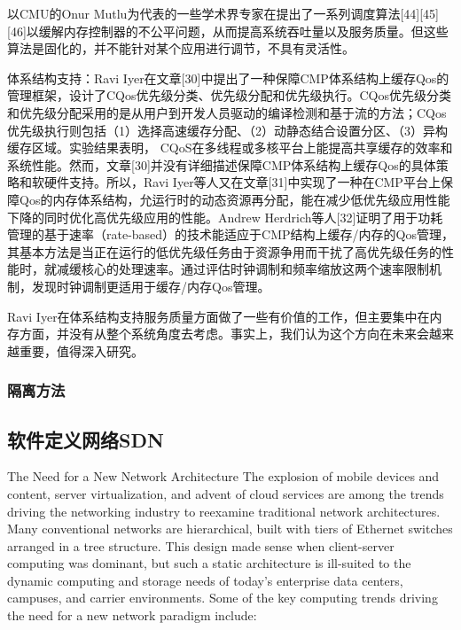 以CMU的Onur Mutlu为代表的一些学术界专家在提出了一系列调度算法[44][45][46]以缓解内存控制器的不公平问题，从而提高系统吞吐量以及服务质量。但这些算法是固化的，并不能针对某个应用进行调节，不具有灵活性。

体系结构支持：Ravi Iyer在文章[30]中提出了一种保障CMP体系结构上缓存Qos的管理框架，设计了CQos优先级分类、优先级分配和优先级执行。CQos优先级分类和优先级分配采用的是从用户到开发人员驱动的编译检测和基于流的方法；CQos优先级执行则包括（1）选择高速缓存分配、（2）动静态结合设置分区、（3）异构缓存区域。实验结果表明， CQoS在多线程或多核平台上能提高共享缓存的效率和系统性能。然而，文章[30]并没有详细描述保障CMP体系结构上缓存Qos的具体策略和软硬件支持。所以，Ravi Iyer等人又在文章[31]中实现了一种在CMP平台上保障Qos的内存体系结构，允运行时的动态资源再分配，能在减少低优先级应用性能下降的同时优化高优先级应用的性能。Andrew Herdrich等人[32]证明了用于功耗管理的基于速率（rate-based）的技术能适应于CMP结构上缓存/内存的Qos管理，其基本方法是当正在运行的低优先级任务由于资源争用而干扰了高优先级任务的性能时，就减缓核心的处理速率。通过评估时钟调制和频率缩放这两个速率限制机制，发现时钟调制更适用于缓存/内存Qos管理。

Ravi Iyer在体系结构支持服务质量方面做了一些有价值的工作，但主要集中在内存方面，并没有从整个系统角度去考虑。事实上，我们认为这个方向在未来会越来越重要，值得深入研究。
 

\subsubsection*{隔离方法}
\fi

\subsection{软件定义网络SDN}
\label{sec:background:sdn}

The Need for a New Network Architecture %
The explosion of mobile devices and content, server virtualization, and
advent of cloud services are among the trends driving the networking
industry to reexamine traditional network architectures. Many conventional
networks are hierarchical, built with tiers of Ethernet switches arranged in
a tree structure. This design made sense when client-server computing
was dominant, but such a static architecture is ill-suited to the dynamic
computing and storage needs of today’s enterprise data centers,
campuses, and carrier environments. Some of the key computing trends
driving the need for a new network paradigm include:


